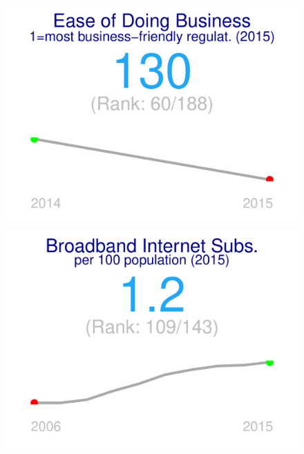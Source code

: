 \documentclass{article}\usepackage[]{graphicx}\usepackage[]{color}
\makeatletter
\def\maxwidth{ %
  \ifdim\Gin@nat@width>\linewidth
    \linewidth
  \else
    \Gin@nat@width
  \fi
}
\makeatother
\begin{document}
\begin{figure}
\begin{minipage}[t]{0.99\textwidth}
\begin{minipage}[t]{0.55\textwidth}
\begin{minipage}[c]{0.30\textwidth}
    \end{minipage}
    \begin{minipage}[c]{0.30\textwidth}


{\centering \includegraphics[width=\maxwidth]{figure/figure_sparkline2-1} 

}



    \end{minipage}
    \begin{minipage}[c]{0.30\textwidth}


{\centering \includegraphics[width=\maxwidth]{figure/figure_sparkline3-1} 

}




\end{minipage}
\end{minipage}
\end{minipage}
\end{figure}
\end{document}
